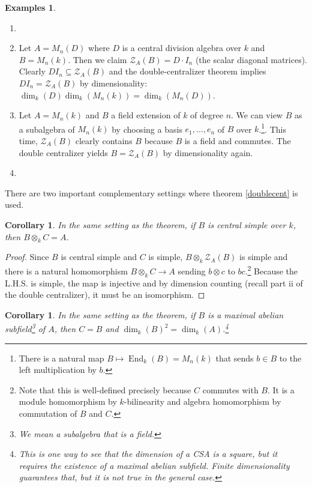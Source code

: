 \documentclass{tufte-handout} %
\newtheorem{cor}[thm]{Corollary}
\theoremstyle{definition}
\newtheorem{exmps}[thm]{Examples}
\theoremstyle{remark}
\newcommand{\mZ}{\mathcal{Z}}
\DeclareMathOperator{\End}{End}
\begin{document}
\begin{exmps}
	\begin{enumerate}
		\item[]
		\item Let $A = M_n(D)$ where $D$ is a central division algebra over $k$ and $B = M_n(k)$. Then we claim $\mZ_A(B)= D\cdot I_n$ (the scalar diagonal matrices). Clearly $DI_n \subseteq \mZ_A(B)$ and the double-centralizer theorem implies $DI_n= \mZ_A(B)$ by dimensionality:  $\dim_k(D) \dim_k(M_n(k)) = \dim_k(M_n(D))$.
		\item Let $A = M_n(k)$ and $B$ a field extension of $k$ of degree $n$. We can view $B$ as a subalgebra of $M_n(k)$ by choosing a basis $e_1,\dots, e_n$ of $B$ over $k$.\footnote{There is a natural map $B \mapsto \End_k(B) = M_n(k)$ that sends $b \in B$ to the left multiplication by $b$.}. This time, $\mZ_A(B)$ clearly contains $B$ because $B$ is a field and commutes. The double centralizer yields $B = \mZ_A(B)$ by dimensionality again.
		\item %
	\end{enumerate}
\end{exmps}
There are two important complementary settings where theorem \ref{doublecent} is used.
\begin{cor}
	In the same setting as the theorem, if $B$ is central simple over $k$, then $B \otimes_k C= A$.
\end{cor}
\begin{proof}
	Since $B$ is central simple and $C$ is simple, $B \otimes_k \mZ_A(B)$ is simple and there is a natural homomorphism $B \otimes_k C \rightarrow A$ sending $b \otimes c$ to $bc$.\footnote{Note that this is well-defined precisely because $C$ commutes with $B$. It is a module homomorphism by $k$-bilinearity and algebra homomorphism by commutation of $B$ and $C$.} Because the L.H.S. is simple, the map is injective and by dimension counting (recall part ii of the double centralizer), it must be an isomorphism.
\end{proof}
\begin{cor}\label{cormaxabel}
	In the same setting as the theorem, if $B$ is a maximal abelian subfield\footnote{We mean a subalgebra that is a field.} of $A$, then $C = B$ and $\dim_k(B)^2 = \dim_k(A)$.\footnote{This is one way to see that the dimension of a CSA is a square, but it requires the existence of a maximal abelian subfield. Finite dimensionality guarantees that, but it is not true in the general case.}
\end{cor}
\end{document}
